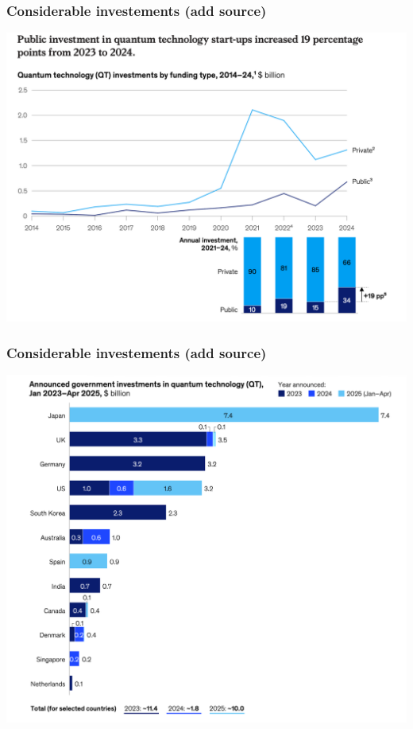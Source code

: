 \documentclass{beamer}
\begin{document}
\begin{frame}
\frametitle{Considerable investements (add source)}


\centerline{\includegraphics[width=0.9\linewidth]{qcfigures/image2.png}}

\end{frame}

\begin{frame}
\frametitle{Considerable investements (add source)}


\centerline{\includegraphics[width=0.9\linewidth]{qcfigures/image3.png}}

\end{frame}
\end{document}
